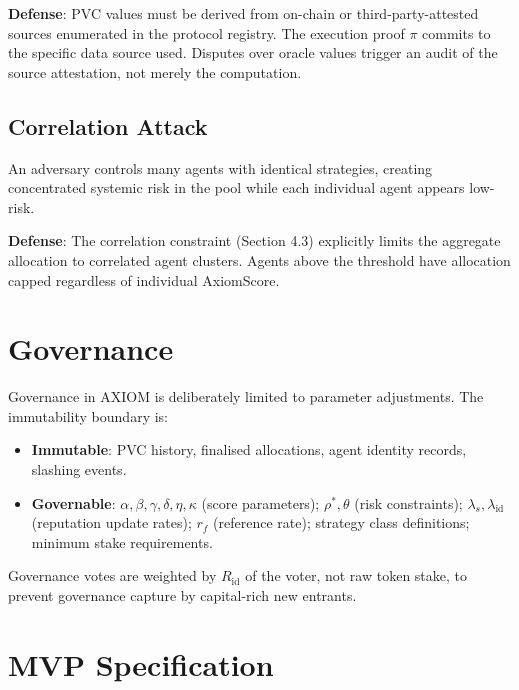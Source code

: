 \documentclass[11pt,a4paper]{article}
\theoremstyle{plain}
\theoremstyle{definition}
\theoremstyle{remark}
\newcommand{\Rid}{R_{\mathrm{id}}}
\begin{document}
\textbf{Defense}: PVC values must be derived from on-chain or third-party-attested
sources enumerated in the protocol registry. The execution proof $\pi$ commits
to the specific data source used. Disputes over oracle values trigger an audit
of the source attestation, not merely the computation.

\subsection{Correlation Attack}

An adversary controls many agents with identical strategies, creating concentrated
systemic risk in the pool while each individual agent appears low-risk.

\textbf{Defense}: The correlation constraint (Section 4.3) explicitly limits
the aggregate allocation to correlated agent clusters. Agents above the
threshold have allocation capped regardless of individual AxiomScore.

\section{Governance}

Governance in AXIOM is deliberately limited to parameter adjustments. The
immutability boundary is:

\begin{itemize}
  \item \textbf{Immutable}: PVC history, finalised allocations, agent identity
        records, slashing events.
  \item \textbf{Governable}: $\alpha, \beta, \gamma, \delta, \eta, \kappa$
        (score parameters); $\rho^*, \theta$ (risk constraints); $\lambda_s,
        \lambda_{\mathrm{id}}$ (reputation update rates); $r_f$ (reference
        rate); strategy class definitions; minimum stake requirements.
\end{itemize}

Governance votes are weighted by $\Rid$ of the voter, not raw token stake,
to prevent governance capture by capital-rich new entrants.

\section{MVP Specification}
\end{document}
